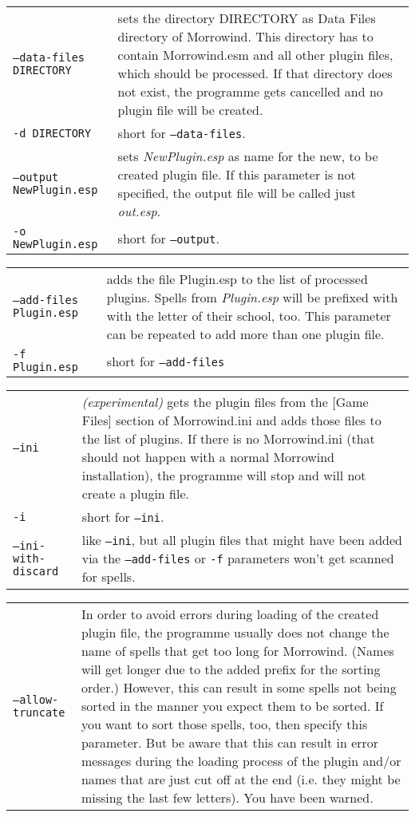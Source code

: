 \documentclass[12pt,oneside,a4paper]{article}
\begin{document}
\begin{tabular}{p{7cm} p{8cm}}
\texttt{--data-files DIRECTORY}   & sets the directory DIRECTORY as Data Files directory of Morrowind. This directory has to contain Morrowind.esm and all other plugin files, which should be processed. If that directory does not exist, the programme gets cancelled and no plugin file will be created.\\
\texttt{-d DIRECTORY}             & short for \texttt{--data-files}.\\
\texttt{--output NewPlugin.esp}   & sets \textit{NewPlugin.esp} as name for the new, to be created plugin file. If this parameter is not specified, the output file will be called just \textit{out.esp}.\\
\texttt{-o NewPlugin.esp}         & short for \texttt{--output}.\\
\end{tabular}
\newline
\begin{tabular}{p{7cm} p{8cm}}
\texttt{--add-files Plugin.esp}   & adds the file Plugin.esp to the list of processed plugins. Spells from \textit{Plugin.esp} will be prefixed with with the letter of their school, too. This pa\-ra\-me\-ter can be repeated to add more than one plugin file.\\
\texttt{-f Plugin.esp}            & short for \texttt{--add-files}\\
\end{tabular}
\newline
\begin{tabular}{p{7cm} p{8cm}}
\texttt{--ini}                    & \textit{(experimental)} gets the plugin files from the [Game Files] section of Morrowind.ini and adds those files to the list of plugins. If there is no Morrowind.ini (that should not happen with a normal Morrowind installation), the programme will stop and will not create a plugin file.\\
\texttt{-i}                       & short for \texttt{--ini}.\\
\texttt{--ini-with-discard}       & like \texttt{--ini}, but all plugin files that might have been added via the \texttt{--add-files} or \texttt{-f} parameters won't get scanned for spells.\\
\end{tabular}
\newline
\begin{tabular}{p{7cm} p{8cm}}
\texttt{--allow-truncate}         & In order to avoid errors during loading of the created plugin file, the programme usually does not change the name of spells that get too long for Morrowind. (Names will get longer due to the added prefix for the sorting order.) However, this can result in some spells not being sorted in the manner you expect them to be sorted. If you want to sort those spells, too, then specify this parameter. But be aware that this can result in error messages during the loading process of the plugin and/or names that are just cut off at the end (i.e. they might be missing the last few letters). You have been warned.\\
\end{tabular}
\end{document}
